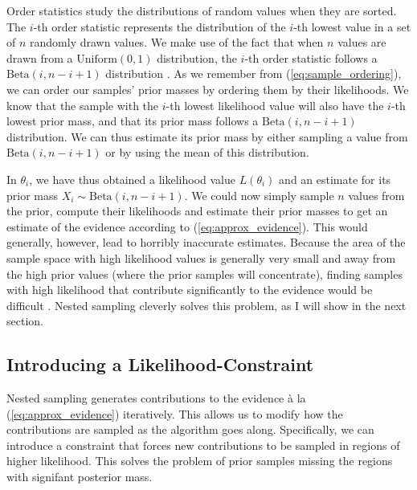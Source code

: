 \documentclass[12pt, a4paper]{report}
\begin{document}
Order statistics study the distributions of random values when they are sorted.
The $i$-th order statistic represents the distribution of the $i$-th lowest value in a set of $n$ randomly drawn values.
We make use of the fact that when $n$ values are drawn from a $\textrm{Uniform}(0,1)$ distribution, the $i$-th order statistic follows a $\textrm{Beta}(i, n-i+1)$ distribution \cite[63]{computational_stats}.
As we remember from (\ref{eq:sample_ordering}), we can order our samples' prior masses by ordering them by their likelihoods.
We know that the sample with the $i$-th lowest likelihood value will also have the $i$-th lowest prior mass, and that its prior mass follows a $\textrm{Beta}(i, n-i+1)$ distribution.
We can thus estimate its prior mass by either sampling a value from $\textrm{Beta}(i, n-i+1)$ or by using the mean of this distribution.

In $\theta_{i}$, we have thus obtained a likelihood value $L(\theta_{i})$ and an estimate for its prior mass $X_{i} \sim  \textrm{Beta}(i,n-i+1)$.
We could now simply sample $n$ values from the prior, compute their likelihoods and estimate their prior masses to get an estimate of the evidence according to (\ref{eq:approx_evidence}).
This would generally, however, lead to horribly inaccurate estimates.
Because the area of the sample space with high likelihood values is generally very small and away from the high prior values (where the prior samples will concentrate), finding samples with high likelihood that contribute significantly to the evidence would be difficult \cite[7]{skilling}.
Nested sampling cleverly solves this problem, as I will show in the next section.

\subsection{Introducing a Likelihood-Constraint}
Nested sampling generates contributions to the evidence à la (\ref{eq:approx_evidence}) iteratively.
This allows us to modify how the contributions are sampled as the algorithm goes along.
Specifically, we can introduce a constraint that forces new contributions to be sampled in regions of higher likelihood.
This solves the problem of prior samples missing the regions with signifant posterior mass.
\end{document}
